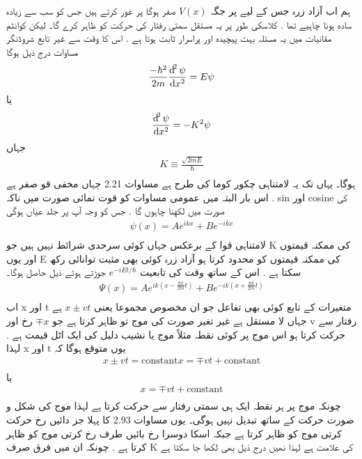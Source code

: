 \documentclass{book}
\begin{document}
ہم اب آزاد زرہ جس کے لیے پر جگہ
\(V(x)\)
صفر ہوگا پر غور کرتے ہیں جس کو سب سے زیادہ ساده ہونا چاہیے تھا . کلاسکی طور پر یہ مستقل سمتی رفتار کی حرکت کو ظاہر کرے گا۔ لیکن کوانٹم مقانیات میں یہ مسئلہ بہت پیچیده اور پراسرار ثابت ہوتا ہے . اس کا وقت سے غیر تابع شروڈنگر مساوات درج ذیل ہوگا
\begin{align*}
\frac{-\hbar^{2}}{2m}\frac{\dif^{2}{\psi}}{\dif{x^{2}}}=E\psi\\
\end{align*}
یا
\begin{align*}
\frac{\dif^{2}{\psi}}{\dif{x^{2}}}=-K^{2}\psi
\end{align*}
جہاں
\begin{align*}
K\equiv\frac{\sqrt{2mE}}{\hbar}\\
\end{align*}
ہوگا۔ یہاں تک یہ لامتناہی چکور كوما کی طرح ہے مساوات 2.21 جہاں مخفی قو صفر ہے . اس بار البتہ میں عمومی مساوات کو قوت نمائی صورت میں ناکہ
sin
اور
cosine
کی صورت میں لكهنا چاہوں گا . جس کو وجہ آپ پر جلد عیاں ہوگی
\begin{align*}
\psi(x)=Ae^{ikx}+Be^{-ikx}\\
\end{align*}
لامتناہی قوا کے برعکس جہاں کوئی سرحدی شرائط نہیں ہیں جو
K
کی ممکنہ قیمتوں اور یوں
E
کی ممکنہ قیمتوں کو محدود کرتا ہو آزاد زرہ کوئی بھی مثبت توانائی رکھ سکتا ہے . اس کے ساتھ وقت کی تابعیت
\(e^{-iEt/\hbar}\)
جوڑتے ہوئے ذیل حاصل ہوگا۔
\begin{align*}
\Psi(x)=Ae^{ik(x-\frac{\hbar k}{2m}t)}+Be^{-ik(x+\frac{\hbar k}{2m}t)}\\
\end{align*}
اب
x
اور
t
متغیرات کے تابع کوئی بھی تفاعل جو ان مخصوص مجموعا یعنی
\(x\pm vt\)
ہے جہاں
لا
مستقل ہے غیر تغیر صورت کی موج تو ظاہر کرتا ہے جو
\(\mp x\)
رخ اور
v
رفتار سے حرکت کرتا ہو اس موج پر کوئی نقطہ مثلاً موج یا نشیب دلیل کی ایک اٹل قیمت ہے . لہذا
x
اور
t
یوں متوقع ہوگا کہ
\begin{align*}
x\pm vt=\text{constant} x=\mp vt+\text{constant}\\
\end{align*}
یا
\begin{align*}
 x=\mp vt+\text{constant}\\
\end{align*}
چونکہ موج پر ہر نقطہ ایک ہی سمتی رفتار سے حرکت کرتا ہے لہذا موج کی شکل و صورت حرکت کے ساتھ تبدیل نہیں ہوگی۔ یوں مساوات 2.93 کا پہلا جز دائیں رخ حرکت کرتی موج کو ظاہر کرتا ہے جبکہ اسکا دوسرا رخ بائیں طرف رخ کرتی موج کو ظاہر کرتا ہے . چونکہ ان میں فرق صرف
K
کی علامت ہے لہذا نھیں درج ذیل بھی لکھا جا سکتا ہے 
\end{document}

